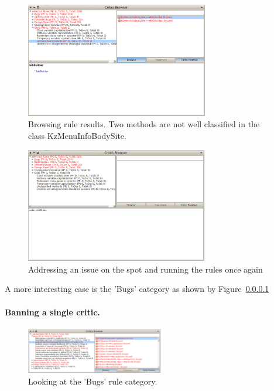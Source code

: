 \documentclass[a4paper,10pt,twoside]{book}
\begin{document}
\begin{figure}[h]
\centering
\includegraphics[width=8cm]{UnclassifiedMethods}
\caption{Browsing rule results. Two methods are not well classified in the class KzMenuInfoBodySite.\label{unclassified}}
\end{figure}


\begin{figure}[h]
\centering
\includegraphics[width=8cm]{ReapplyingTheRulesAfterAChange}
\caption{Addressing an issue on the spot and running the rules once again\label{reapplying}}
\end{figure}





A more interesting case is the 'Bugs' category as shown by Figure~\ref{}


\paragraph{Banning a single critic.}


\begin{figure}[h]
\centering
\includegraphics[width=6cm]{LookingAtBugs}
\caption{Looking at the 'Bugs' rule category.}
\end{figure}
\end{document}
